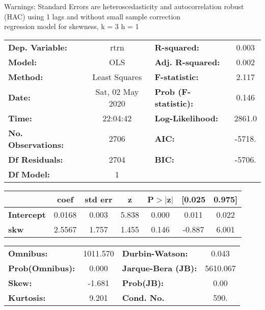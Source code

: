 Warnings: \newline
 [1] Standard Errors are heteroscedasticity and autocorrelation robust (HAC) using 1 lags and without small sample correction\\ 

regression model for skewness, k = 3 h = 1\begin{center}
\begin{tabular}{lclc}
\toprule
\textbf{Dep. Variable:}    &       rtrn       & \textbf{  R-squared:         } &     0.003   \\
\textbf{Model:}            &       OLS        & \textbf{  Adj. R-squared:    } &     0.002   \\
\textbf{Method:}           &  Least Squares   & \textbf{  F-statistic:       } &     2.117   \\
\textbf{Date:}             & Sat, 02 May 2020 & \textbf{  Prob (F-statistic):} &    0.146    \\
\textbf{Time:}             &     22:04:42     & \textbf{  Log-Likelihood:    } &    2861.0   \\
\textbf{No. Observations:} &        2706      & \textbf{  AIC:               } &    -5718.   \\
\textbf{Df Residuals:}     &        2704      & \textbf{  BIC:               } &    -5706.   \\
\textbf{Df Model:}         &           1      & \textbf{                     } &             \\
\bottomrule
\end{tabular}
\begin{tabular}{lcccccc}
                   & \textbf{coef} & \textbf{std err} & \textbf{z} & \textbf{P$> |$z$|$} & \textbf{[0.025} & \textbf{0.975]}  \\
\midrule
\textbf{Intercept} &       0.0168  &        0.003     &     5.838  &         0.000        &        0.011    &        0.022     \\
\textbf{skw}       &       2.5567  &        1.757     &     1.455  &         0.146        &       -0.887    &        6.001     \\
\bottomrule
\end{tabular}
\begin{tabular}{lclc}
\textbf{Omnibus:}       & 1011.570 & \textbf{  Durbin-Watson:     } &    0.043  \\
\textbf{Prob(Omnibus):} &   0.000  & \textbf{  Jarque-Bera (JB):  } & 5610.067  \\
\textbf{Skew:}          &  -1.681  & \textbf{  Prob(JB):          } &     0.00  \\
\textbf{Kurtosis:}      &   9.201  & \textbf{  Cond. No.          } &     590.  \\
\bottomrule
\end{tabular}
\end{center}

